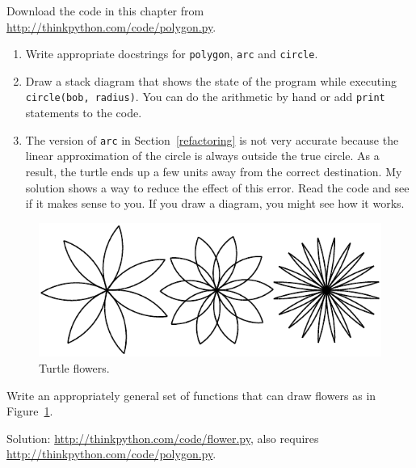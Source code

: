 \documentclass[10pt]{book}
\begin{document}
\begin{CJK}{UTF8}{gbsn}
\begin{exercise}

Download the code in this chapter from
\url{http://thinkpython.com/code/polygon.py}.

\begin{enumerate}

\item Write appropriate docstrings for {\tt polygon}, {\tt arc} and
{\tt circle}.

\item Draw a stack diagram that shows the state of the program
while executing {\tt circle(bob, radius)}.  You can do the
arithmetic by hand or add {\tt print} statements to the code.

\item The version of {\tt arc} in Section~\ref{refactoring} is not
very accurate because the linear approximation of the
circle is always outside the true circle.  As a result,
the turtle ends up a few units away from the correct
destination. My solution shows a way to reduce
the effect of this error.  Read the code and see if it makes
sense to you.  If you draw a diagram, you might see how it works.

\end{enumerate}

\end{exercise}

\begin{figure}
\centerline
{\includegraphics[scale=0.8]{figs/flowers.pdf}}
\caption{Turtle flowers.}
\label{fig.flowers}
\end{figure}

\begin{exercise}

Write an appropriately general set of functions that
can draw flowers as in Figure~\ref{fig.flowers}.

Solution: \url{http://thinkpython.com/code/flower.py},
also requires \url{http://thinkpython.com/code/polygon.py}.


\end{exercise}
\end{CJK}
\end{document}
